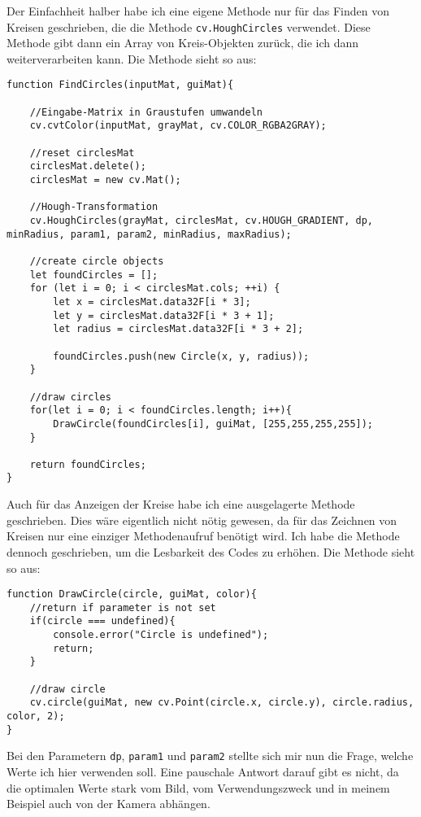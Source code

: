 Der Einfachheit halber habe ich eine eigene Methode nur für das Finden von Kreisen geschrieben, die die Methode \texttt{cv.HoughCircles} verwendet. Diese Methode gibt dann ein Array von Kreis-Objekten zurück, die ich dann weiterverarbeiten kann. Die Methode sieht so aus:

\begin{lstlisting}[style=JavaScript]
function FindCircles(inputMat, guiMat){

    //Eingabe-Matrix in Graustufen umwandeln
    cv.cvtColor(inputMat, grayMat, cv.COLOR_RGBA2GRAY);

    //reset circlesMat
    circlesMat.delete();
    circlesMat = new cv.Mat();

    //Hough-Transformation
    cv.HoughCircles(grayMat, circlesMat, cv.HOUGH_GRADIENT, dp, minRadius, param1, param2, minRadius, maxRadius);

    //create circle objects
    let foundCircles = [];
    for (let i = 0; i < circlesMat.cols; ++i) {
        let x = circlesMat.data32F[i * 3];
        let y = circlesMat.data32F[i * 3 + 1];
        let radius = circlesMat.data32F[i * 3 + 2];

        foundCircles.push(new Circle(x, y, radius));
    }

    //draw circles
    for(let i = 0; i < foundCircles.length; i++){
        DrawCircle(foundCircles[i], guiMat, [255,255,255,255]);
    }

    return foundCircles;
}
\end{lstlisting}

Auch für das Anzeigen der Kreise habe ich eine ausgelagerte Methode geschrieben. Dies wäre eigentlich nicht nötig gewesen, da für das Zeichnen von Kreisen nur eine einziger Methodenaufruf benötigt wird. Ich habe die Methode dennoch geschrieben, um die Lesbarkeit des Codes zu erhöhen. Die Methode sieht so aus:

\begin{lstlisting}[style=JavaScript]
function DrawCircle(circle, guiMat, color){
    //return if parameter is not set
    if(circle === undefined){
        console.error("Circle is undefined");
        return;
    }

    //draw circle
    cv.circle(guiMat, new cv.Point(circle.x, circle.y), circle.radius, color, 2);
}
\end{lstlisting}

Bei den Parametern \texttt{dp}, \texttt{param1} und \texttt{param2} stellte sich mir nun die Frage, welche Werte ich hier verwenden soll. Eine pauschale Antwort darauf gibt es nicht, da die optimalen Werte stark vom Bild, vom Verwendungszweck und in meinem Beispiel auch von der Kamera abhängen.

